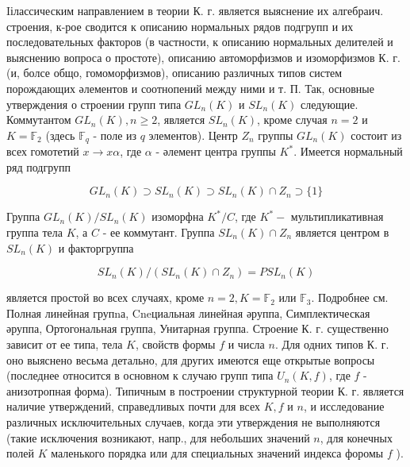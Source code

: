 \documentclass[10pt]{article}
\begin{document}
Iілассическим направлением в теории К. г. является выяснение их алгебраич. строения, к-рое сводится к описанию нормальных рядов подгрупп и их последовательных факторов (в частности, к описанию нормальных делителей и выяснению вопроса о простоте), описанию автоморфизмов и изоморфизмов К. г. (и, болсе общо, гомоморфизмов), описанию различных типов систем порождающих әлементов и соотнопений между ними и т. П. Так, основные утверждения о строении групп типа $G L_{n}(K)$ и $S L_{n}(K)$ следующие. Коммутантом $G L_{n}(K), n \geqslant 2$, является $S L_{n}(K)$, кроме случая $n=2$ и $K=\mathbb{F}_{2}$ (здесь $\mathbb{F}_{q}$ - поле из $q$ элементов). Центр $Z_{n}$ группы $G L_{n}(K)$ состоит из всех гомотетий $x \rightarrow x \alpha$, где $\alpha$ - әлемент центра группы $K^{*}$. Имеется нормальный ряд подгрупп



\[

G L_{n}(K) \supset S L_{n}(K) \supset S L_{n}(K) \cap Z_{n} \supset\{1\}

\]



Группа $G L_{n}(K) / S L_{n}(K)$ изоморфна $K^{*} / C$, где $K^{*}-$ мультипликативная группа тела $K$, а $C$ - ее коммутант. Группа $S L_{n}(K) \cap Z_{n}$ является центром в $S L_{n}(K)$ и факторгруппа



\[

S L_{n}(K) /\left(S L_{n}(K) \cap Z_{n}\right)=P S L_{n}(K)

\]



является простой во всех случаях, кроме $n=2, K=\mathbb{F}_{2}$ или $\mathbb{F}_{3}$. Подробнее см. Полная линейная групnа, Cneциальная линейная әруппа, Симплектическая әруппа, Ортогональная группа, Унитарная группа. Строение К. г. существенно зависит от ее типа, тела $K$, свойств формы $f$ и числа $n$. Для одних типов К. г. оно выяснено весьма детально, для других имеются еще открытые вопросы (последнее относится в основном к случаю групп типа $U_{n}(K, f)$, где $f$ - анизотропная форма). Типичным в построении структурной теории К. г. является наличие утверждений, справедливых почти для всех $K, f$ и $n$, и исследование различных исключительных случаев, когда эти утверждения не выполняются (такие исключения возникают, напр., для небольших значений $n$, для конечных полей $K$ маленького порядка или для специальных значений индекса форомы $f$ ).
\end{document}
